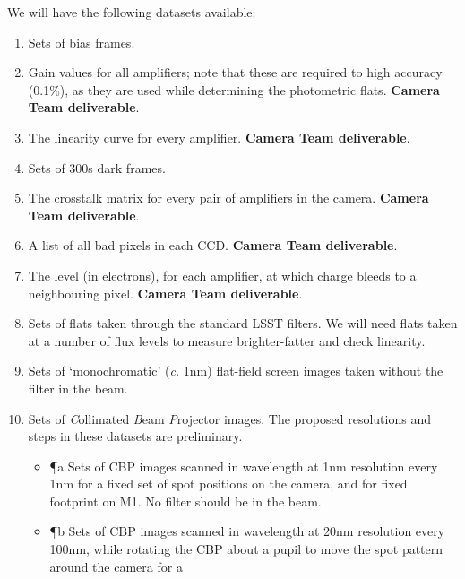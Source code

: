 \documentclass[12pt]{article}
\makeatletter
\renewcommand{\c}{\textit{c.}\xspace}
\newcommand{\cameraTeam}{\textbf{Camera Team deliverable}\xspace}
\newcommand{\myLabel}[2]{\def\@currentlabel{#2}\label{#1}}
\makeatother
\begin{document}
We will have the following datasets available:
\begin{enumerate}[label=\P\arabic*,itemsep=5pt]
  \newcommand{\addMyLabel}[2]{\myLabel{#1}{\P#2}\P#2}
   \item\label{inputs:bias} Sets of bias frames.
   \item\label{inputs:gain} Gain values for all amplifiers;  note that these are required to high
     accuracy (0.1\%), as they are used while determining the photometric flats. \cameraTeam.
   \item\label{inputs:linearityCurve}  The linearity curve for every amplifier. \cameraTeam.
   \item\label{inputs:dark} Sets of 300s dark frames.
   \item\label{inputs:crosstalk} The crosstalk matrix for every pair of amplifiers in the camera.
     \cameraTeam.
   \item\label{inputs:defectList} A list of all bad pixels in each CCD. \cameraTeam.
   \item\label{inputs:saturationLevel} The level (in electrons), for each amplifier, at which charge bleeds
     to a neighbouring pixel. \cameraTeam.
   \item\label{inputs:broadFlat} Sets of flats taken through the standard LSST filters.  We will
     need flats taken at a number of flux levels to measure brighter-fatter and check linearity.
   \item\label{inputs:monoFlat} Sets of `monochromatic' (\c 1nm) flat-field screen images taken
     without the filter in the beam.
   \item\label{inputs:CBP} Sets of \textit{C}ollimated \textit{B}eam \textit{P}rojector images.
     The proposed resolutions and steps in these datasets are preliminary.
     \begin{itemize}
     \item[]\addMyLabel{inputs:CBP:mono}{a} Sets of CBP images scanned in wavelength at 1nm resolution every
       1nm for a fixed set of spot positions on the camera, and for fixed footprint on M1.  No filter
       should be in the beam.
     \item[]\addMyLabel{inputs:CBP:spot}{b} Sets of CBP images scanned in wavelength at 20nm resolution every
       100nm, while rotating the CBP about a pupil to move the spot pattern around the camera for a

\end{itemize}
\end{enumerate}
\end{document}

